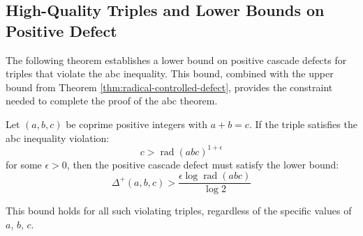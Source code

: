\subsection{High-Quality Triples and Lower Bounds on Positive Defect}
\label{subsec:high-quality-characterization}

The following theorem establishes a lower bound on positive cascade defects for triples that violate the abc inequality. This bound, combined with the upper bound from Theorem \ref{thm:radical-controlled-defect}, provides the constraint needed to complete the proof of the abc theorem.

\begin{theorem}
\label{thm:high-quality-characterization}

Let $(a,b,c)$ be coprime positive integers with $a + b = c$. If the triple satisfies the abc inequality violation:
\begin{equation}
c > \operatorname{rad}(abc)^{1+\epsilon}
\end{equation}
for some $\epsilon > 0$, then the positive cascade defect must satisfy the lower bound:
\begin{equation}
\label{eq:high-quality-lower-bound}
\Delta^{+}(a,b,c) > \frac{\epsilon \log \operatorname{rad}(abc)}{\log 2}
\end{equation}

This bound holds for all such violating triples, regardless of the specific values of $a$, $b$, $c$.

\end{theorem}

